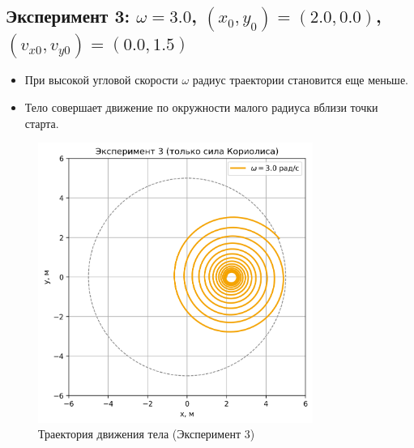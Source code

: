 \documentclass[a4paper,12pt]{article}
\begin{document}
\subsection*{Эксперимент 3: $\omega = 3.0$, $(x_0, y_0) = (2.0, 0.0)$, $(v_{x0}, v_{y0}) = (0.0, 1.5)$}
\begin{itemize}
    \item При высокой угловой скорости $\omega$ радиус траектории становится еще меньше.
    \item Тело совершает движение по окружности малого радиуса вблизи точки старта.
\end{itemize}
\begin{figure}[H]
    \centering
    \includegraphics[width=0.8\textwidth]{plots_coriolis_only/experiment_3.png}
    \caption{Траектория движения тела (Эксперимент 3)}
\end{figure}

\newpage
\end{document}
